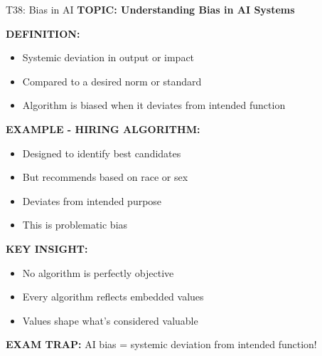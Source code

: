 \documentclass[8pt]{beamer}
\begin{document}
	
	\begin{frame}{T38: Bias in AI}
		\fontsize{6.5}{7.5}\selectfont
		\textbf{TOPIC: Understanding Bias in AI Systems}
		
		\vspace{0.1cm}
		\textbf{DEFINITION:}
		\begin{itemize}
			\item Systemic deviation in output or impact
			\item Compared to a desired norm or standard
			\item Algorithm is biased when it deviates from intended function
		\end{itemize}
		
		\vspace{0.1cm}
		\textbf{EXAMPLE - HIRING ALGORITHM:}
		\begin{itemize}
			\item Designed to identify best candidates
			\item But recommends based on race or sex
			\item Deviates from intended purpose
			\item This is problematic bias
		\end{itemize}
		
		\vspace{0.1cm}
		\textbf{KEY INSIGHT:}
		\begin{itemize}
			\item No algorithm is perfectly objective
			\item Every algorithm reflects embedded values
			\item Values shape what's considered valuable
		\end{itemize}
		
		\textcolor{myred}{\textbf{EXAM TRAP:}} AI bias = \textcolor{myblue}{systemic deviation from intended function}!
	\end{frame}
	
\end{document}
